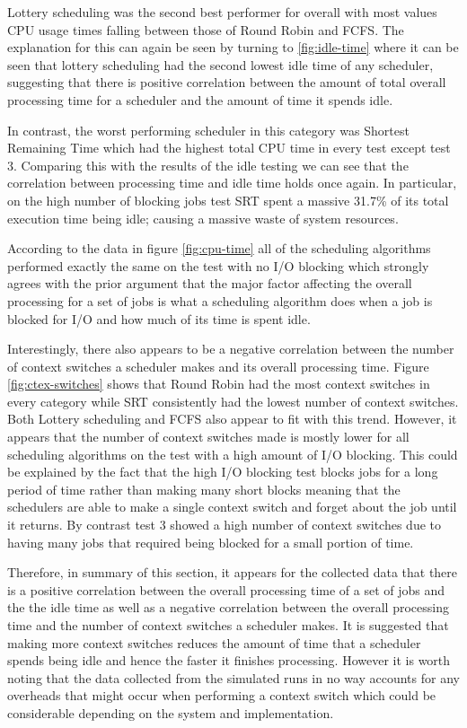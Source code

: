 \documentclass{acm_proc_article-sp}
\begin{document}
Lottery scheduling was the second best performer for overall with most values CPU usage times falling between those of Round Robin and FCFS. The explanation for this can again be seen by turning to \ref{fig:idle-time} where it can be seen that lottery scheduling had the second lowest idle time of any scheduler, suggesting that there is positive correlation between the amount of total overall processing time for a scheduler and the amount of time it spends idle.

In contrast, the worst performing scheduler in this category was Shortest Remaining Time which had the highest total CPU time in every test except test 3. Comparing this with the results of the idle testing we can see that the correlation between processing time and idle time holds once again. In particular, on the high number of blocking jobs test SRT spent a massive 31.7\% of its total execution time being idle; causing a massive waste of system resources.

According to the data in figure \ref{fig:cpu-time} all of the scheduling algorithms performed exactly the same on the test with no I/O blocking which strongly agrees with the prior argument that the major factor affecting the overall processing for a set of jobs is what a scheduling algorithm does when a job is blocked for I/O and how much of its time is spent idle.

Interestingly, there also appears to be a negative correlation between the number of context switches a scheduler makes and its overall processing time. Figure \ref{fig:ctex-switches} shows that Round Robin had the most context switches in every category while SRT consistently had the lowest number of context switches. Both Lottery scheduling and FCFS also appear to fit with this trend. However, it appears that the number of context switches made is mostly lower for all scheduling algorithms on the test with a high amount of I/O blocking. This could be explained by the fact that the high I/O blocking test blocks jobs for a long period of time rather than making many short blocks meaning that the schedulers are able to make a single context switch and forget about the job until it returns. By contrast test 3 showed a high number of context switches due to having many jobs that required being blocked for a small portion of time.

Therefore, in summary of this section, it appears for the collected data that there is a positive correlation between the overall processing time of a set of jobs and the the idle time as well as a negative correlation between the overall processing time and the number of context switches a scheduler makes. It is suggested that making more context switches reduces the amount of time that a scheduler spends being idle and hence the faster it finishes processing. However it is worth noting that the data collected from the simulated runs in no way accounts for any overheads that might occur when performing a context switch which could be considerable depending on the system and implementation.
\end{document}
